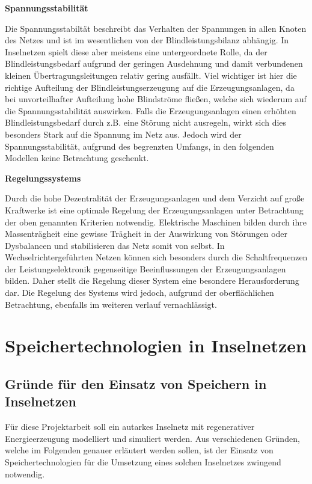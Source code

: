 \textbf{Spannungsstabilität}

Die Spannungsstabiltät beschreibt das Verhalten der Spannungen in allen Knoten des Netzes und ist im wesentlichen von der Blindleistungsbilanz abhängig. In Inselnetzen spielt diese aber meistens eine untergeordnete Rolle, da der Blindleistungsbedarf aufgrund der geringen Ausdehnung und damit verbundenen kleinen Übertragungsleitungen relativ gering ausfällt. Viel wichtiger ist hier die richtige Aufteilung der Blindleistungserzeugung auf die Erzeugungsanlagen, da bei unvorteilhafter Aufteilung hohe Blindströme fließen, welche sich wiederum auf die Spannungsstabilität auswirken. Falls die Erzeugungsanlagen einen erhöhten Blindleistungsbedarf durch z.B. eine Störung nicht ausregeln, wirkt sich dies besonders Stark auf die Spannung im Netz aus. Jedoch wird der Spannungsstabilität, aufgrund des begrenzten Umfangs, in den folgenden Modellen keine Betrachtung geschenkt. \cite{Willenberg2021}

\textbf{Regelungssystems}

Durch die hohe Dezentralität der Erzeugungsanlagen und dem Verzicht auf große Kraftwerke ist eine optimale Regelung der Erzeugungsanlagen unter Betrachtung der oben genannten Kriterien notwendig. Elektrische Maschinen bilden durch ihre Massenträgheit eine gewisse Trägheit in der Auswirkung von Störungen oder Dysbalancen und stabilisieren das Netz somit von selbst. In Wechselrichtergeführten Netzen können sich besonders durch die Schaltfrequenzen der Leistungselektronik gegenseitige Beeinflussungen der Erzeugungsanlagen bilden. Daher stellt die Regelung dieser System eine besondere Herausforderung dar. Die Regelung des Systems wird jedoch, aufgrund der oberflächlichen Betrachtung, ebenfalls im weiteren verlauf vernachlässigt. \cite{Willenberg2021}

\section{Speichertechnologien in Inselnetzen}

\subsection{Gründe für den Einsatz von Speichern in Inselnetzen}
Für diese Projektarbeit soll ein autarkes Inselnetz mit regenerativer Energieerzeugung 
modelliert und simuliert werden.
Aus verschiedenen Gründen, welche im Folgenden genauer erläutert werden sollen, ist der Einsatz von
Speichertechnologien für die Umsetzung eines solchen Inselnetzes zwingend notwendig.

